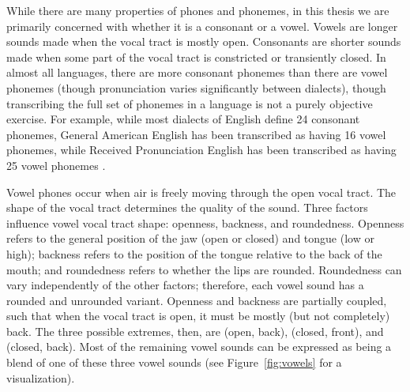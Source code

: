 While there are many properties
of phones and phonemes,
in this thesis we are primarily concerned
with whether it
is a consonant or a vowel.
Vowels are longer sounds
made when the vocal tract is mostly open.
Consonants are shorter sounds
made when some part of the vocal tract
is constricted or transiently closed.
In almost all languages,
there are more consonant phonemes
than there are vowel phonemes
(though pronunciation varies significantly
between dialects),
though transcribing the full set of
phonemes in a language is
not a purely objective exercise.
For example, while most dialects
of English define 24 consonant phonemes,
General American English has been transcribed
as having 16 vowel phonemes,
while Received Pronunciation English
has been transcribed as having 25 vowel phonemes
\citep{wells1982}.

Vowel phones occur when air is freely
moving through the open vocal tract.
The shape of the vocal tract determines
the quality of the sound.
Three factors influence vowel vocal tract shape:
openness, backness, and roundedness.
Openness refers to the general position
of the jaw (open or closed) and tongue (low or high);
backness refers to the position of the
tongue relative to the back of the mouth;
and roundedness refers to
whether the lips are rounded.
Roundedness can vary independently
of the other factors;
therefore, each vowel sound has a rounded
and unrounded variant.
Openness and backness are partially coupled,
such that when the vocal tract is open,
it must be mostly (but not completely) back.
The three possible extremes, then,
are  (open, back),
 (closed, front),
and  (closed, back).
Most of the remaining vowel sounds
can be expressed as being
a blend of one of these three vowel sounds
(see Figure~\ref{fig:vowels} for a visualization).

